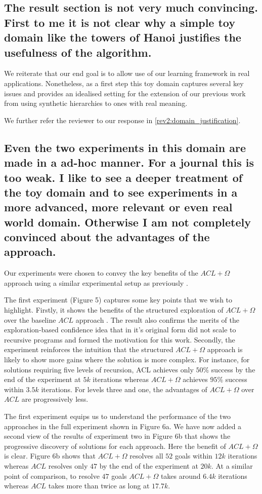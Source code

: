\documentclass[preprint,12pt]{elsarticle}
\begin{document}
\subsection{The result section is not very much convincing. First to me it is not clear why a simple toy domain like the towers of Hanoi justifies the usefulness of the algorithm.}

We reiterate that our end goal is to allow use of our learning framework in real applications. Nonetheless, as a first step this toy domain captures several key issues and provides an idealised setting for the extension of our previous work from using synthetic hierarchies \cite{Airiau:IJAT09,Singh:AAMAS10} to ones with real meaning. 

We further refer the reviewer to our response in \ref{rev2:domain_justification}.


\subsection{Even the two experiments in this domain are made in a ad-hoc manner. For a journal this is too weak. I like to see a deeper treatment of the toy domain and to see experiments in a more advanced, more relevant or even real world domain. Otherwise I am not completely convinced about the advantages of the approach.}

Our experiments were chosen to convey the key benefits of the $ACL+\Omega$ approach using a similar experimental setup as previously \cite{Singh:AAMAS10}.

The first experiment (Figure 5) captures some key points that we wish to highlight. Firstly, it shows the benefits of the structured exploration of $ACL+\Omega$ over the baseline $ACL$ approach \cite{Airiau:IJAT09,Singh:AAMAS10}. The result also confirms the merits of the exploration-based confidence idea that in it's original form \cite{Singh:AAMAS10} did not scale to recursive programs and formed the motivation for this work. Secondly, the experiment reinforces the intuition that the structured $ACL+\Omega$ approach is likely to show more gains where the solution is more complex. For instance, for solutions requiring five levels of recursion, ACL achieves only $50\%$ success by the end of the experiment at $5k$ iterations whereas $ACL+\Omega$ achieves $95\%$ success within $3.5k$ iterations. For levels three and one, the advantages of $ACL+\Omega$ over $ACL$ are progressively less. 

The first experiment equips us to understand the performance of the two approaches in the full experiment shown in Figure 6a. We have now added a second view of the results of experiment two in Figure 6b that shows the progressive discovery of solutions for each approach. Here the benefit of $ACL+\Omega$ is clear. Figure 6b shows that $ACL+\Omega$ resolves all $52$ goals within $12k$ iterations whereas $ACL$ resolves only $47$ by the end of the experiment at $20k$. At a similar point of comparison, to resolve $47$ goals $ACL+\Omega$ takes around $6.4k$ iterations whereas $ACL$ takes more than twice as long at $17.7k$. 
\end{document}
